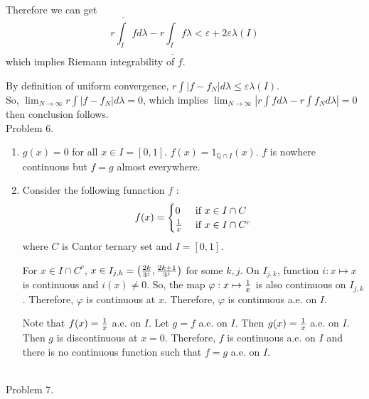Therefore we can get
\begin{equation*}
	r \overline{\int_I}fd\lambda - r\underline{\int_I}f\lambda < \varepsilon + 2\varepsilon \lambda\left( I \right)
	\label{3}
\end{equation*}
which implies Riemann integrability of $f$.

By definition of uniform convergence, $r\int \left | f - f_N \right | d\lambda \leq \varepsilon \lambda\left( I \right)$.\\
So, $\lim_{N\rightarrow \infty}r\int \left | f - f_N \right | d\lambda = 0$, which implies $\lim_{N\rightarrow \infty}\left | r\int fd\lambda - r\int f_N d\lambda \right | = 0$ then conclusion follows. \\

Problem 6.\\

\begin{enumerate}[label = (\alph*)]
	\item $g(x) = 0$ for all $x \in I = \left[ 0, 1 \right]$. $f(x) = 1_{\mathbb{Q}\cap I}(x)$. $f$ is nowhere continuous but $f = g$ almost everywhere.
	\item Consider the following funnction $f$ :
		\begin{equation*}
			f(x) = 
			\begin{cases}
				0 & \text{ if } x \in I\cap C \\
				{1 \over x } & \text{ if } x \in I \cap C^{c}
			\end{cases}
			\label{<+label+>}
		\end{equation*}
		where $C$ is Cantor ternary set and $I = \left[ 0, 1 \right]$.
		
		For $x \in I \cap C^c$, $x \in I_{j, k} =  \left( {2k \over 3^j}, {2k+1 \over 3^j} \right)$ for some $k, j$. 
		On $I_{j, k}$, function $i : x \mapsto x$ is continuous and $i(x) \ne 0$. So, the map $\varphi:x \mapsto {1\over x}$ is also continuous on $I_{j, k}$.
		Therefore, $\varphi$ is continuous at $x$. Therefore, $\varphi$ is continuous a.e. on $I$.

		Note that $f(x) = {1\over x }$ a.e. on $I$. Let $g = f$ a.e. on $I$. Then $g(x) = {1\over x}$ a.e. on $I$. Then $g$ is discontinuous at $x = 0$. Therefore, $f$ is continuous a.e. on $I$ and there is no continuous function such that $f = g$ a.e. on $I$.
\end{enumerate}

\hfill \\

Problem 7. \\

